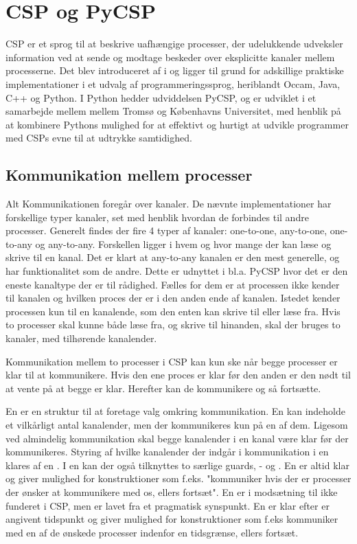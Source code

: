 \chapter{CSP og PyCSP}
CSP er et sprog til at beskrive uafhængige processer, der udelukkende udveksler information ved at sende og modtage beskeder over eksplicitte kanaler mellem processerne. Det blev introduceret af \citeauthor{hoare-csp} i \cite{hoare-csp} og ligger til grund for adskillige praktiske implementationer i et udvalg af programmeringssprog, heriblandt Occam, Java, C++ og Python\cite{May1983, jcsp, Brown2007, pycsp}. I Python hedder udviddelsen PyCSP, og er udviklet i et samarbejde mellem mellem Tromsø og Københavns Universitet, med henblik på at kombinere Pythons mulighed for at effektivt og hurtigt at udvikle programmer med CSPs evne til at udtrykke samtidighed\cite{pycsp}. 


\section{Kommunikation mellem processer}
Alt Kommunikationen foregår over kanaler. De nævnte implementationer har forskellige typer kanaler, set med henblik hvordan de forbindes til andre processer. Generelt findes der fire 4 typer af kanaler: one-to-one, any-to-one, one-to-any og any-to-any. Forskellen ligger i hvem og hvor mange der kan læse og skrive til en kanal. Det er klart at any-to-any kanalen er den mest generelle, og har funktionalitet som de andre. Dette er udnyttet i bl.a. PyCSP hvor det er den eneste kanaltype der er til rådighed. Fælles for dem er at processen ikke kender til kanalen og hvilken proces der er i den anden ende af kanalen. Istedet kender processen kun til en  kanalende, som  den enten kan skrive til eller læse fra. Hvis to processer skal kunne både læse fra, og skrive til hinanden, skal der bruges to kanaler, med tilhørende kanalender. 

Kommunikation mellem to processer i CSP kan kun ske når begge processer er klar til at kommunikere. Hvis den ene proces er klar før den anden er den nødt til at vente på at begge er klar. Herefter kan de kommunikere og så fortsætte.

En  er en struktur til at foretage valg omkring kommunikation. En  kan indeholde et vilkårligt antal kanalender, men der kommunikeres kun på en af dem. Ligesom ved almindelig kommunikation skal begge kanalender i en kanal være klar før der kommunikeres. Styring af hvilke kanalender der indgår i kommunikation i en   klares af en . I en  kan der også tilknyttes to særlige guards, - og . En  er altid klar og giver mulighed for konstruktioner som f.eks. "kommuniker hvis der er processer der ønsker at kommunikere med os, ellers fortsæt". En  er i modsætning til  ikke funderet i CSP, men er lavet fra et pragmatisk synspunkt. En  er klar efter er angivent tidspunkt og giver mulighed for konstruktioner som f.eks kommuniker med en af de ønskede processer indenfor en tidsgrænse, ellers fortsæt. 

